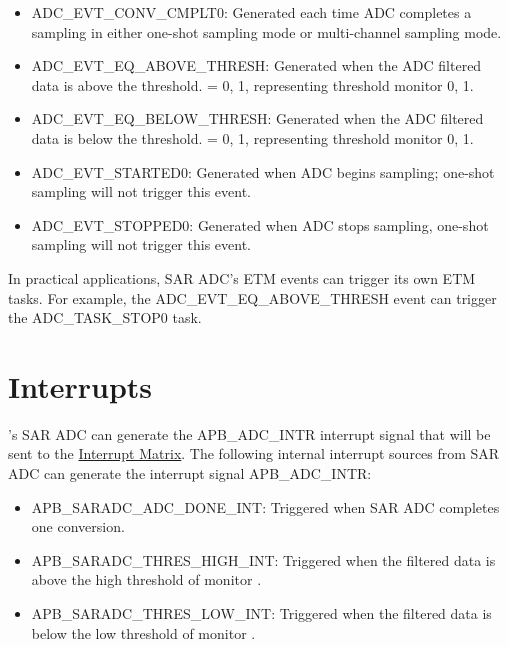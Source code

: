 \documentclass[main\_\_EN.tex]{subfiles}
\begin{document}
\begin{itemize}
    \item ADC\_EVT\_CONV\_CMPLT0: Generated each time ADC completes a sampling in either one-shot sampling mode or multi-channel sampling mode.
    \item ADC\_EVT\_EQ\_ABOVE\_THRESH: Generated when the ADC filtered data is above the threshold.  = 0, 1, representing threshold monitor 0, 1.
    \item ADC\_EVT\_EQ\_BELOW\_THRESH: Generated when the ADC filtered data is below the threshold.  = 0, 1, representing threshold monitor 0, 1.
    \item ADC\_EVT\_STARTED0: Generated when ADC begins sampling; one-shot sampling will not trigger this event.
    \item ADC\_EVT\_STOPPED0: Generated when ADC stops sampling, one-shot sampling will not trigger this event.
\end{itemize}

In practical applications, SAR ADC's ETM events can trigger its own ETM tasks. For example, the ADC\_EVT\_EQ\_ABOVE\_THRESH event can trigger the ADC\_TASK\_STOP0 task.



\section{Interrupts}
\label{sec:adc_interrupts}

\chipname{}'s SAR ADC can generate the APB\_ADC\_INTR interrupt signal that will be sent to the \hyperref[mod:intmtrx]{Interrupt Matrix}. The following internal interrupt sources from SAR ADC can generate the interrupt signal APB\_ADC\_INTR:

\begin{itemize}
   \item \label{int:SARADCDONEINT1} APB\_SARADC\_ADC\_DONE\_INT: Triggered when SAR ADC completes one conversion.
   \item \label{int:APBSARADCTHRESxHIGHINT} APB\_SARADC\_THRES\_HIGH\_INT: Triggered when the filtered data is above the high threshold of monitor .
   \item \label{int:APBSARADCTHRESxLOWINT} APB\_SARADC\_THRES\_LOW\_INT: Triggered when the filtered data is below the low threshold of monitor .
\end{itemize}
\end{document}
